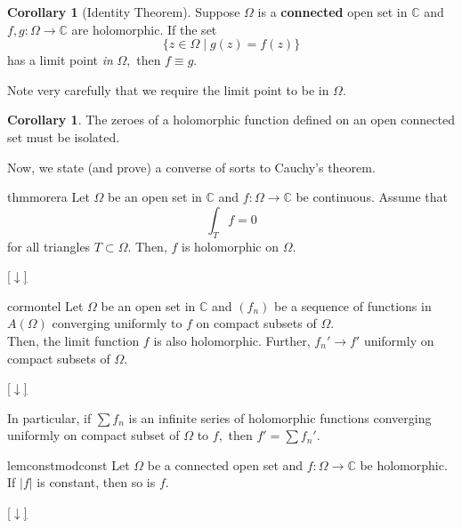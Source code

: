 \documentclass[12pt,oneside]{book}
\theoremstyle{definition}
\numberwithin{thm}{chapter}
\newtheorem{cor}[thm]{Corollary}
\newcommand{\downsym}{[$\downarrow$]}
\begin{document}
\begin{cor}[Identity Theorem]
	Suppose $\Omega$ is a \textbf{connected} open set in $\mathbb{C}$ and $f, g:\Omega \to \mathbb{C}$ are holomorphic. If the set
	\begin{equation*} 
		\{z \in \Omega \mid g(z) = f(z)\}
	\end{equation*}
	has a limit point \emph{in} $\Omega,$ then $f \equiv g.$
\end{cor}
Note very carefully that we require the limit point to be in $\Omega.$

\begin{cor}
	The zeroes of a holomorphic function defined on an open connected set must be isolated.
\end{cor}

Now, we state (and prove) a converse of sorts to Cauchy's theorem.
\begin{restatable}{thm}{morera}
\label{thm:morera}
	Let $\Omega$ be an open set in $\mathbb{C}$ and $f:\Omega \to \mathbb{C}$ be continuous. Assume that 
	\begin{equation*} 
		\int_T f = 0
	\end{equation*}
	for all triangles $T \subset \Omega.$ Then, $f$ is holomorphic on $\Omega.$
\end{restatable}
\begin{flushright}\hyperref[thm:morera2]{\downsym}\end{flushright}

\begin{restatable}{cor}{montel}
\label{cor:montel}
	Let $\Omega$ be an open set in $\mathbb{C}$ and $(f_n)$ be a sequence of functions in $A(\Omega)$ converging uniformly to $f$ on compact subsets of $\Omega.$\\
	Then, the limit function $f$ is also holomorphic. Further, $f_n' \to f'$ uniformly on compact subsets of $\Omega.$
\end{restatable}
\begin{flushright}\hyperref[cor:montel2]{\downsym}\end{flushright}
In particular, if $\sum f_n$ is an infinite series of holomorphic functions converging uniformly on compact subset of $\Omega$ to $f,$ then $f' = \sum f_n'.$

\begin{restatable}[]{lem}{constmodconst}
\label{lem:constmodconst}
	Let $\Omega$ be a connected open set and $f:\Omega\to\mathbb{C}$ be holomorphic. If $\left|f\right|$ is constant, then so is $f.$
\end{restatable}
\begin{flushright}\hyperref[lem:constmodconst2]{\downsym}\end{flushright}
\end{document}
